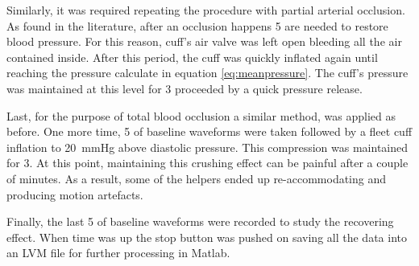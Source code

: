 Similarly, it was required repeating the procedure with partial arterial occlusion. As found in the literature, after an occlusion happens \SI{5}{\min} are needed to restore blood pressure. For this reason, cuff's air valve was left open bleeding all the air contained inside. After this period, the cuff was quickly inflated again until reaching the pressure calculate in equation \ref{eq:meanpressure}. The cuff's pressure was maintained at this level for \SI{3}{\min} proceeded by a quick pressure release. 

Last, for the purpose of total blood occlusion a similar method, was applied as before. One more time, \SI{5}{\min} of baseline waveforms were taken followed by a fleet cuff inflation to \SI{20}{mmHg} above diastolic pressure. This compression was maintained for \SI{3}{\min}. At this point, maintaining this crushing effect can be painful after a couple of minutes. As a result, some of the helpers ended up re-accommodating and producing motion artefacts. 

Finally, the last \SI{5}{\min} of baseline waveforms were recorded to study the recovering effect. When time was up the stop button was pushed on saving all the data into an LVM file for further processing in Matlab. 


